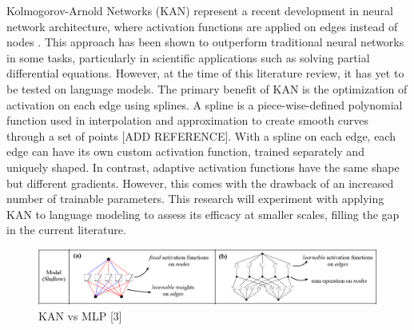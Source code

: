 Kolmogorov-Arnold Networks (KAN) represent a recent development in neural network architecture, where activation functions are applied on edges instead of nodes \cite{Liu2024}. This approach has been shown to outperform traditional neural networks in some tasks, particularly in scientific applications such as solving partial differential equations. However, at the time of this literature review, it has yet to be tested on language models. The primary benefit of KAN is the optimization of activation on each edge using splines. A spline is a piece-wise-defined polynomial function used in interpolation and approximation to create smooth curves through a set of points [ADD REFERENCE]. With a spline on each edge, each edge can have its own custom activation function, trained separately and uniquely shaped. In contrast, adaptive activation functions have the same shape but different gradients. However, this comes with the drawback of an increased number of trainable parameters. This research will experiment with applying KAN to language modeling to assess its efficacy at smaller scales, filling the gap in the current literature.

\vspace*{\fill}
\begin{figure}[ht]
    \centering
    \includegraphics[width=\columnwidth * 2]{figures/kan-network.png}
    \caption{KAN vs MLP [3]}
    \label{fig:your-label}
\end{figure}
\vspace*{\fill}